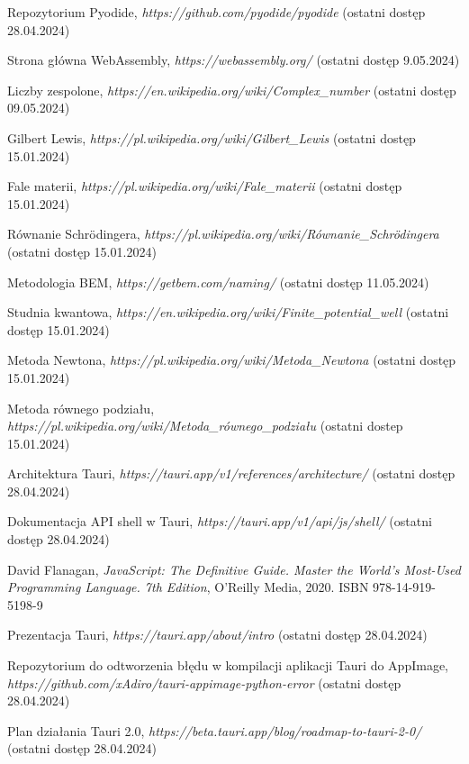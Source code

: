 \documentclass{SGGW-thesis}
\begin{document}
\begin{thebibliography}{9}
	Repozytorium Pyodide, 
	\textit{https://github.com/pyodide/pyodide}
	(ostatni dostęp 28.04.2024)
	
	Strona główna WebAssembly,
	\textit{https://webassembly.org/}
	(ostatni dostęp 9.05.2024)
	
	Liczby zespolone,
	\textit{https://en.wikipedia.org/wiki/Complex\_number}
	(ostatni dostęp 09.05.2024)
	
	Gilbert Lewis, 
	\textit{https://pl.wikipedia.org/wiki/Gilbert\_Lewis}
	(ostatni dostęp 15.01.2024)
	
	Fale materii, 
	\textit{https://pl.wikipedia.org/wiki/Fale\_materii}
	(ostatni dostęp 15.01.2024)
	
	Równanie Schrödingera, 
	\textit{https://pl.wikipedia.org/wiki/Równanie\_Schrödingera}
	(ostatni dostęp 15.01.2024)
	
	Metodologia BEM,
	\textit{https://getbem.com/naming/}
	(ostatni dostęp 11.05.2024)
	
	Studnia kwantowa, 
	\textit{https://en.wikipedia.org/wiki/Finite\_potential\_well}
	(ostatni dostęp 15.01.2024)
	
	Metoda Newtona, 
	\textit{https://pl.wikipedia.org/wiki/Metoda\_Newtona}
	(ostatni dostęp 15.01.2024) 
	
	Metoda równego podziału, 
	\textit{https://pl.wikipedia.org/wiki/Metoda\_równego\_podziału}
	(ostatni dostep 15.01.2024)
	
	Architektura Tauri, 
	\textit{https://tauri.app/v1/references/architecture/}
	(ostatni dostęp 28.04.2024)
	
	Dokumentacja API shell w Tauri, 
	\textit{https://tauri.app/v1/api/js/shell/}
	(ostatni dostęp 28.04.2024)
	
	David Flanagan, 
	\textit{JavaScript: The Definitive Guide. Master the World's Most-Used Programming Language. 7th Edition}, 
	O'Reilly Media, 2020. ISBN 978-14-919-5198-9
	
	Prezentacja Tauri, 
	\textit{https://tauri.app/about/intro}
	(ostatni dostęp 28.04.2024)
	
	Repozytorium do odtworzenia błędu w kompilacji aplikacji Tauri do AppImage, 
	\textit{https://github.com/xAdiro/tauri-appimage-python-error}
	(ostatni dostęp 28.04.2024)
	
	Plan działania Tauri 2.0, 
	\textit{https://beta.tauri.app/blog/roadmap-to-tauri-2-0/}
	(ostatni dostęp 28.04.2024)
	
	
	
	
	
	
	
	
	
\end{thebibliography}

\beforelastpage
\end{document}
